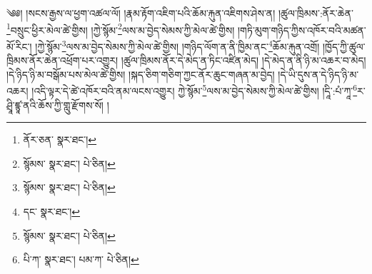\setcounter{footnote}{0} 
༄༅། །སངས་རྒྱས་ལ་ཕྱག་འཚལ་ལོ། །རྣམ་རྟོག་འཇིག་པའི་ཆོམ་རྐུན་འཇིགས་ཤེས་ན། །ཚུལ་ཁྲིམས་:ནོར་ཆེན་\footnote{ནོར་ཅན་  སྣར་ཐང་། }བསྲུང་ཕྱིར་མེལ་ཚེ་གྱིས། །ཀྱེ་སྙོམ་\footnote{སྙོམས་  སྣར་ཐང་།  པེ་ཅིན། }ལས་མ་བྱེད་སེམས་ཀྱི་མེལ་ཚེ་གྱིས། །གཏི་མུག་གཉིད་ཀྱིས་འཁོར་བའི་མཚན་མོ་རིང་། །ཀྱེ་སྙོམ་\footnote{སྙོམས་  སྣར་ཐང་།  པེ་ཅིན། }ལས་མ་བྱེད་སེམས་ཀྱི་མེལ་ཚེ་གྱིས། །གཉིད་ལོག་ན་ནི་ཁྱིམ་ནང་\footnote{དང་  སྣར་ཐང་། }ཆོམ་རྐུན་འགྲོ། །ཁྱོད་ཀྱི་ཚུལ་ཁྲིམས་ནོར་ཆེན་འཕྲོག་པར་འགྱུར། །ཚུལ་ཁྲིམས་ནོར་དེ་མེད་ན་ཏིང་འཛིན་མེད། །དེ་མེད་ན་ནི་ཉི་མ་འཆར་བ་མེད། །དེ་ཉིད་ཉི་མ་བསྒོམ་པས་མེལ་ཚེ་གྱིས། །སྐད་ཅིག་གཅིག་ཀྱང་ནོར་ཆུང་གཞན་མ་བྱེད། །དེ་ཡི་དུས་ན་དེ་ཉིད་ཉི་མ་འཆར། །འདི་ལྟར་དེ་ཚེ་འཁོར་བའི་ནམ་ལངས་འགྱུར། ཀྱེ་སྙོམ་\footnote{སྙོམས་  སྣར་ཐང་།  པེ་ཅིན། }ལས་མ་བྱེད་སེམས་ཀྱི་མེལ་ཚེ་གྱིས། །དཱི་:པཾ་ཀཱ་\footnote{པི་ཀ་  སྣར་ཐང་། པམ་ཀ་  པེ་ཅིན། }ར་ཤྲཱི་ཛྙཱ་ནའི་ཆོས་ཀྱི་གླུ་རྫོགས་སོ། ། 